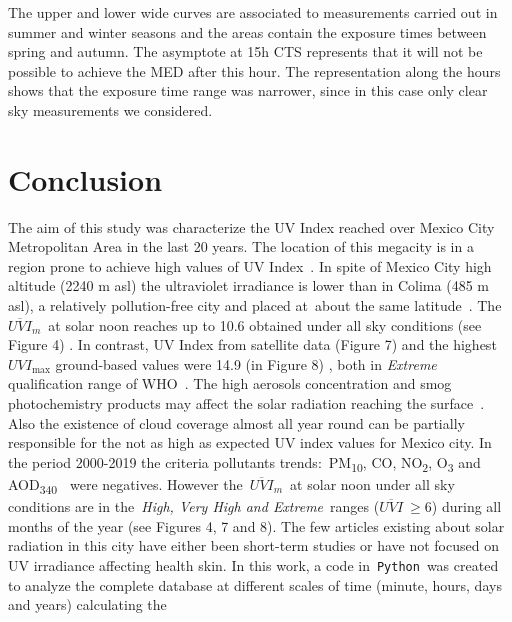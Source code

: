 \documentclass{article}
\begin{document}
The upper and lower wide curves are associated to measurements carried
out in summer and winter seasons and the areas contain the exposure
times between spring and autumn. The asymptote at 15h CTS represents
that it will not be possible to achieve the MED after this hour. The
representation along the hours shows that the exposure time range was
narrower, since in this case only clear sky measurements we considered.

\section*{Conclusion}

{\label{507127}}

The aim of this study was characterize the UV Index reached over Mexico
City Metropolitan Area in the last 20 years. The location of this
megacity is in a region prone to achieve high values of UV
Index~\cite{Tanskanen_2006,Zaratti_2014}. In spite of Mexico City high altitude (2240 m
asl) the ultraviolet irradiance is lower than in Colima (485 m asl), a
relatively pollution-free city and placed at~about the same
latitude~\cite{Galindo_1995}. The~\(\overline{UVI}_m\)~at solar noon
reaches up to 10.6 obtained under all sky conditions (see
Figure 4)%
. In contrast, UV Index from
satellite data 
(Figure 7) %
and the
highest~\(UVI_{\max}\) ground-based values were 14.9 (in
Figure 8)%
, both in \emph{Extreme}
qualification range of WHO~\cite{2002}. The high aerosols
concentration and smog photochemistry products may affect the solar
radiation reaching the surface~\cite{Castro_2001,Palancar_2012}. Also the existence of
cloud coverage almost all year round can be partially responsible for
the not as high as expected UV index values for Mexico city. In the
period 2000-2019 the criteria pollutants trends:~PM\textsubscript{10},
CO, NO\textsubscript{2}, O\textsubscript{3} and
AOD\textsubscript{340~}~were negatives. However
the~\(\overline{UVI}_m\)~at solar noon under all sky conditions are in
the\emph{~High, Very High and Extreme}~ranges (\(\overline{UVI}\ \ge6\))
during all months of the year 
(see Figures 4, 7 and 8). 
The few articles existing about
solar radiation in this city have either been short-term studies or have
not focused on UV irradiance affecting health skin. In this work, a code
in~\texttt{Python}~was created to analyze the complete database at
different scales of time (minute, hours, days and years) calculating the
\end{document}
